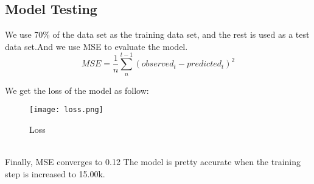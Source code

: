 \documentclass{mcmthesis}
\begin{document}
\subsection{Model Testing}
We use 70\% of the data set as the training data set, and the rest is used as a test data set.And we use MSE to evaluate the model.
\[MSE=\frac{1}{n}\sum_{n}^{t-1}\left ( observed_{t} -predicted_{t}\right)^{2}\]

We get the loss of the model as follow:\\
\begin{figure}[h]
\small
\centering
\texttt{[image: loss.png]}
\caption{Loss} 
\label{fig:lf}
\end{figure}\\

Finally, MSE converges to 0.12
The model is pretty accurate when the training step is increased to 15.00k.
\end{document}
